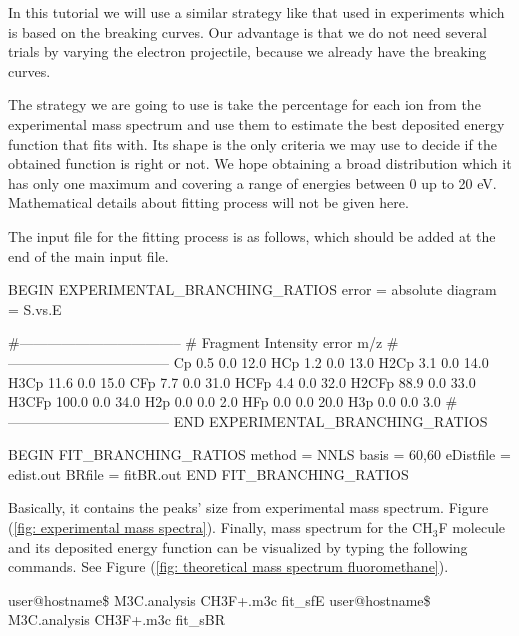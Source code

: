 \documentclass[a4paper,12pt]{article}
\begin{document}
In this tutorial we will use a similar strategy like that used in experiments which is based on the breaking curves. Our advantage is that we do not need 
several trials by varying the electron projectile, because we already have the breaking curves.

The strategy we are going to use is take the percentage for each ion from the experimental mass spectrum and use them to estimate the best deposited energy 
function that fits with. Its shape is the only criteria we may use to decide if the obtained function is right or not. We hope obtaining a broad distribution 
which it has only one maximum and covering a range of energies between 0 up to 20 eV. Mathematical details about fitting process will not be given here.

The input file for the fitting process is as follows, which should be added at the end of the main input file.

\begin{bifile}[caption=Input file blocks to configure the fitting method]
BEGIN EXPERIMENTAL_BRANCHING_RATIOS
        error = absolute
        diagram = S.vs.E

        #-----------------------------------
        # Fragment  Intensity  error    m/z
        #-----------------------------------
                Cp        0.5    0.0   12.0
               HCp        1.2    0.0   13.0
              H2Cp        3.1    0.0   14.0
              H3Cp       11.6    0.0   15.0
               CFp        7.7    0.0   31.0
              HCFp        4.4    0.0   32.0
             H2CFp       88.9    0.0   33.0
             H3CFp      100.0    0.0   34.0
               H2p        0.0    0.0    2.0
               HFp        0.0    0.0   20.0
               H3p        0.0    0.0    3.0
		#-----------------------------------
END EXPERIMENTAL_BRANCHING_RATIOS

BEGIN FIT_BRANCHING_RATIOS
        method = NNLS
        basis = 60,60
        eDistfile = edist.out
        BRfile = fitBR.out
END FIT_BRANCHING_RATIOS
\end{bifile}

Basically, it contains the peaks' size from experimental mass spectrum. Figure (\ref{fig: experimental mass spectra}). Finally, mass spectrum for the CH$_3$F 
molecule and its deposited energy function can be visualized by typing the following commands. See Figure (\ref{fig: theoretical mass spectrum fluoromethane}).

\begin{shellexec}
user@hostname\$ M3C.analysis CH3F+.m3c fit_sfE
user@hostname\$ M3C.analysis CH3F+.m3c fit_sBR
\end{shellexec}
\end{document}
